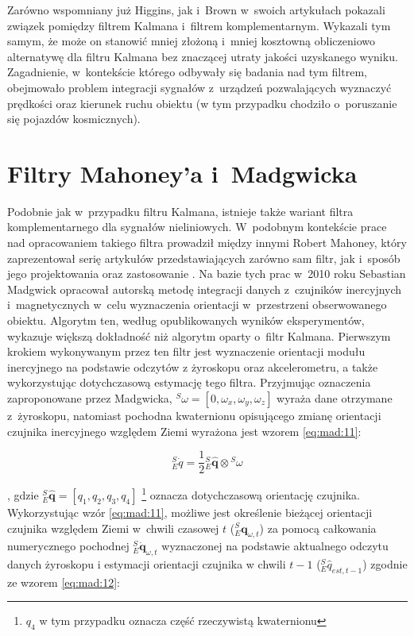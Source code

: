 Zarówno wspomniany już Higgins, jak i~Brown \cite{BROWN1972} w~swoich artykułach pokazali związek pomiędzy filtrem Kalmana i~filtrem komplementarnym. Wykazali tym samym, że może on stanowić mniej złożoną i~mniej kosztowną obliczeniowo alternatywę dla filtru Kalmana bez znaczącej utraty jakości uzyskanego wyniku. Zagadnienie, w~kontekście którego odbywały się badania nad tym filtrem, obejmowało problem integracji sygnałów z~urządzeń pozwalających wyznaczyć prędkości oraz kierunek ruchu obiektu (w tym przypadku chodziło o~poruszanie się pojazdów kosmicznych).
\section*{Filtry Mahoney'a i~Madgwicka}
Podobnie jak w~przypadku filtru Kalmana, istnieje także wariant filtra komplementarnego dla sygnałów nieliniowych. W~podobnym kontekście prace nad opracowaniem takiego filtra prowadził między innymi Robert Mahoney, który zaprezentował serię artykułów przedstawiających zarówno sam filtr, jak i~sposób jego projektowania oraz zastosowanie \cite{Baldwin2007,Mahony2005a,Mahony2008,Euston2008}. 
Na bazie tych prac w~2010 roku Sebastian Madgwick opracował autorską metodę \cite{Madgwick2010,Madgwick2011} integracji danych z~czujników inercyjnych i~magnetycznych w~celu wyznaczenia orientacji w~przestrzeni obserwowanego obiektu. Algorytm ten, według opublikowanych wyników eksperymentów, wykazuje większą dokładność niż algorytm oparty o~filtr Kalmana.
Pierwszym krokiem wykonywanym przez ten filtr jest wyznaczenie orientacji modułu inercyjnego na podstawie odczytów z żyroskopu oraz akcelerometru, a także wykorzystując dotychczasową estymację tego filtra. Przyjmując oznaczenia zaproponowane przez Madgwicka, $^S \omega = [0,\omega_x,\omega_y,\omega_z]$ wyraża dane otrzymane z~żyroskopu, natomiast pochodna kwaternionu opisującego zmianę orientacji czujnika inercyjnego względem Ziemi wyrażona jest wzorem \ref{eq:mad:11}:

\begin{equation}
	{^S_E \dot{q}} = \frac{1}{2}{^S_E \hat{\mathbf{q}}}\otimes {^S{\omega}}
	\label{eq:mad:11}
\end{equation}

, gdzie ${^S_E \hat{\mathbf{q}} = [q_1,q_2,q_3,q_4]}$ \footnote{$q_4$ w tym przypadku oznacza część rzeczywistą kwaternionu} oznacza dotychczasową orientację czujnika. Wykorzystując wzór \ref{eq:mad:11}, możliwe jest określenie bieżącej orientacji czujnika względem Ziemi w~chwili czasowej $t$ ($^S_E{\mathbf{q}}_{\omega,t}$) za pomocą całkowania numerycznego pochodnej $^S_E\dot{\mathbf{q}}_{\omega,t}$ wyznaczonej na podstawie aktualnego odczytu danych żyroskopu i estymacji orientacji czujnika w chwili $t-1$ (${^S_E \hat{q}_{est, t-1}}$) zgodnie ze wzorem \ref{eq:mad:12}: 

